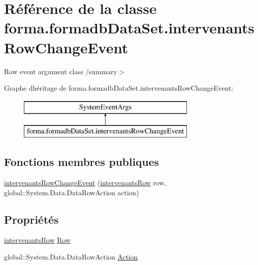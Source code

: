 \hypertarget{classforma_1_1formadb_data_set_1_1intervenants_row_change_event}{}\section{Référence de la classe forma.\+formadb\+Data\+Set.\+intervenants\+Row\+Change\+Event}
\label{classforma_1_1formadb_data_set_1_1intervenants_row_change_event}


Row event argument class /summary$>$  


Graphe d\textquotesingle{}héritage de forma.\+formadb\+Data\+Set.\+intervenants\+Row\+Change\+Event\+:\begin{figure}[H]
\begin{center}
\leavevmode
\includegraphics[height=2.000000cm]{classforma_1_1formadb_data_set_1_1intervenants_row_change_event}
\end{center}
\end{figure}
\subsection*{Fonctions membres publiques}
\begin{DoxyCompactItemize}
\item 
\hyperlink{classforma_1_1formadb_data_set_1_1intervenants_row_change_event_aa8166e81ccd067764de034f6b5f562f9}{intervenants\+Row\+Change\+Event} (\hyperlink{classforma_1_1formadb_data_set_1_1intervenants_row}{intervenants\+Row} row, global\+::\+System.\+Data.\+Data\+Row\+Action action)
\end{DoxyCompactItemize}
\subsection*{Propriétés}
\begin{DoxyCompactItemize}
\item 
\hyperlink{classforma_1_1formadb_data_set_1_1intervenants_row}{intervenants\+Row} \hyperlink{classforma_1_1formadb_data_set_1_1intervenants_row_change_event_a0c1fea3405b5b8cbf8080469b253debd}{Row}
\item 
global\+::\+System.\+Data.\+Data\+Row\+Action \hyperlink{classforma_1_1formadb_data_set_1_1intervenants_row_change_event_adc73a6ee6668313af1498cf610edba06}{Action}
\end{DoxyCompactItemize}


